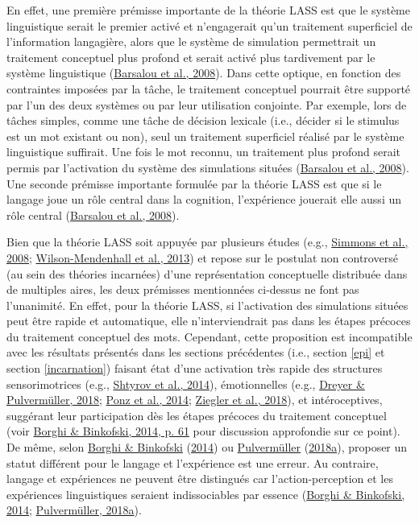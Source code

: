 \documentclass[
  a4paper,12pt,twoside,onecolumn,openright,final,oldfontcommands]{memoir}
\begin{document}
En effet, une première prémisse importante de la théorie LASS est que le système linguistique serait le premier activé et n'engagerait qu'un traitement superficiel de l'information langagière, alors que le système de simulation permettrait un traitement conceptuel plus profond et serait activé plus tardivement par le système linguistique (\protect\hyperlink{ref-barsalou_language_2008}{Barsalou et al., 2008}). Dans cette optique, en fonction des contraintes imposées par la tâche, le traitement conceptuel pourrait être supporté par l'un des deux systèmes ou par leur utilisation conjointe. Par exemple, lors de tâches simples, comme une tâche de décision lexicale (i.e., décider si le stimulus est un mot existant ou non), seul un traitement superficiel réalisé par le système linguistique suffirait. Une fois le mot reconnu, un traitement plus profond serait permis par l'activation du système des simulations situées (\protect\hyperlink{ref-barsalou_language_2008}{Barsalou et al., 2008}). Une seconde prémisse importante formulée par la théorie LASS est que si le langage joue un rôle central dans la cognition, l'expérience jouerait elle aussi un rôle central (\protect\hyperlink{ref-barsalou_language_2008}{Barsalou et al., 2008}).

Bien que la théorie LASS soit appuyée par plusieurs études (e.g., \protect\hyperlink{ref-simmons_fmri_2008}{Simmons et al., 2008}; \protect\hyperlink{ref-wilson-mendenhall_contextual_2013}{Wilson-Mendenhall et al., 2013}) et repose sur le postulat non controversé (au sein des théories incarnées) d'une représentation conceptuelle distribuée dans de multiples aires, les deux prémisses mentionnées ci-dessus ne font pas l'unanimité. En effet, pour la théorie LASS, si l'activation des simulations situées peut être rapide et automatique, elle n'interviendrait pas dans les étapes précoces du traitement conceptuel des mots. Cependant, cette proposition est incompatible avec les résultats présentés dans les sections précédentes (i.e., section \ref{epi} et section \ref{incarnation}) faisant état d'une activation très rapide des structures sensorimotrices (e.g., \protect\hyperlink{ref-shtyrov_automatic_2014}{Shtyrov et al., 2014}), émotionnelles (e.g., \protect\hyperlink{ref-dreyer_abstract_2018}{Dreyer \& Pulvermüller, 2018}; \protect\hyperlink{ref-ponz_emotion_2014}{Ponz et al., 2014}; \protect\hyperlink{ref-ziegler_words_2018}{Ziegler et al., 2018}), et intéroceptives, suggérant leur participation dès les étapes précoces du traitement conceptuel (voir \protect\hyperlink{ref-borghi_words_2014}{Borghi \& Binkofski, 2014, p. 61} pour discussion approfondie sur ce point). De même, selon \protect\hyperlink{ref-borghi_words_2014}{Borghi \& Binkofski} (\protect\hyperlink{ref-borghi_words_2014}{2014}) ou \protect\hyperlink{ref-pulvermuller_neural_2018}{Pulvermüller} (\protect\hyperlink{ref-pulvermuller_neural_2018}{2018a}), proposer un statut différent pour le langage et l'expérience est une erreur. Au contraire, langage et expériences ne peuvent être distingués car l'action-perception et les expériences linguistiques seraient indissociables par essence (\protect\hyperlink{ref-borghi_words_2014}{Borghi \& Binkofski, 2014}; \protect\hyperlink{ref-pulvermuller_neural_2018}{Pulvermüller, 2018a}).
\end{document}
